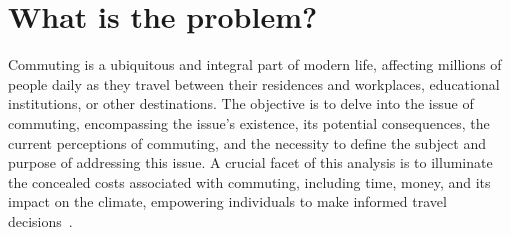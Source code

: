 \section{What is the problem?}\label{sec:what-is-the-problem?}

Commuting is a ubiquitous and integral part of modern life, affecting millions of people daily as they travel between
their residences and workplaces, educational institutions, or other destinations.
The objective is to delve into the issue of commuting, encompassing the issue's existence, its potential consequences,
the current perceptions of commuting, and the necessity to define the subject and purpose of addressing this issue.
A crucial facet of this analysis is to illuminate the concealed costs associated with commuting, including time, money,
and its impact on the climate, empowering individuals to make informed travel decisions~\cite{alma9921355859805762}.

